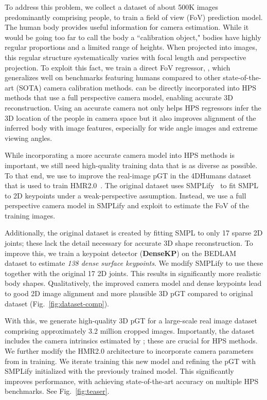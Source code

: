 To address this problem, we collect a dataset of about 500K images predominantly comprising  people, to train a field of view (FoV) prediction model. 
The human body provides useful information for camera estimation. 
While it would be going too far to call the body a ``calibration object," bodies have highly regular proportions and a limited range of heights.
When projected into images, this regular structure systematically varies with focal length and perspective projection.
To exploit this fact, we train a direct FoV regressor, \textbf{\cameramodel}, which generalizes well on benchmarks featuring humans compared to other state-of-the-art (SOTA) camera calibration methods. 
\cameramodel can be directly incorporated into HPS methods that use a full perspective camera model, enabling accurate 3D reconstruction. 
Using an accurate camera not only helps HPS regressors infer the 3D location of the people in camera space but it also improves alignment of the inferred body with image features, especially for wide angle images and extreme viewing angles.

While incorporating a more accurate camera model into HPS methods is important, we still need high-quality training data that is as diverse as possible.
To that end, we use \cameramodel to improve the real-image pGT in the 4DHumans dataset that is used to train HMR2.0~\cite{hmr2}.
The original dataset uses SMPLify~\cite{smplify} to fit SMPL to 2D keypoints under a weak-perspective assumption.
Instead, we use a full perspective camera model in SMPLify and exploit \cameramodel to estimate the FoV of the training images. 

Additionally, the original dataset is created by fitting SMPL to only 17 sparse 2D joints; these lack the detail necessary for accurate 3D shape reconstruction. 
To improve this, we train a keypoint detector (\textbf{DenseKP}) on the BEDLAM~\cite{bedlam} dataset to estimate {\em 138 dense surface keypoints}.
We modify SMPLify to use these together with the original 17 2D joints.
This results in significantly more realistic body shapes.
Qualitatively, the improved camera model and dense keypoints lead to good 2D image alignment and more plausible 3D pGT compared to original dataset (Fig.~\ref{fig:dataset-comp}).

With this, we generate high-quality 3D pGT for a large-scale real image dataset comprising approximately 3.2 million cropped images. 
Importantly, the dataset includes the camera intrinsics estimated by \cameramodel; these are crucial for HPS methods. We further modify the HMR2.0 architecture to incorporate camera parameters from \cameramodel in training. 
We iterate training this new \textbf{\hpsmodel} model and refining the pGT with SMPLify initialized with the previously trained model.
This significantly improves performance, with \hpsmodel achieving state-of-the-art accuracy on multiple HPS benchmarks.
See Fig.~\ref{fig:teaser}.

